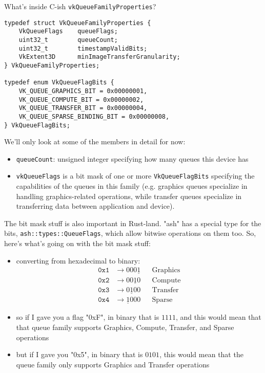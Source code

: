 \documentclass[12pt,letterpaper]{article}
\newcommand{\ril}[1]{\texttt{#1}}
\newcommand{\cil}[1]{\texttt{#1}}
\begin{document}
		What's inside C-ish \cil{vkQueueFamilyProperties}?
	\begin{verbatim}
typedef struct VkQueueFamilyProperties {
	VkQueueFlags    queueFlags;
	uint32_t        queueCount;
	uint32_t        timestampValidBits;
	VkExtent3D      minImageTransferGranularity;
} VkQueueFamilyProperties;

typedef enum VkQueueFlagBits {
	VK_QUEUE_GRAPHICS_BIT = 0x00000001,
	VK_QUEUE_COMPUTE_BIT = 0x00000002,
	VK_QUEUE_TRANSFER_BIT = 0x00000004,
	VK_QUEUE_SPARSE_BINDING_BIT = 0x00000008,
} VkQueueFlagBits;
	\end{verbatim}
	
		We'll only look at some of the members in detail for now:
			\begin{itemize}
				\item \cil{queueCount}: unsigned integer specifying how many queues this device has 
				\item \cil{vkQueueFlags} is a bit mask of one or more \cil{VkQueueFlagBits} specifying the capabilities of the queues in this family (e.g. graphics queues specialize in handling graphics-related operations, while transfer queues specialize in transferring data between application and device).
			\end{itemize}
		
		The bit mask stuff is also important in Rust-land. "ash" has a special type for the bits, \ril{ash::types::QueueFlags}, which allow bitwise operations on them too. So, here's what's going on with the bit mask stuff:
			\begin{itemize}
				\item converting from hexadecimal to binary:
					\begin{align*}
						\mathtt{0x1} &\rightarrow 000\underline{1} && \text{Graphics}\\
						\mathtt{0x2} &\rightarrow 00\underline{1}0 && \text{Compute}\\
						\mathtt{0x3} &\rightarrow 0\underline{1}00 && \text{Transfer}\\
						\mathtt{0x4} &\rightarrow \underline{1}000 && \text{Sparse}
					\end{align*}
				
				\item so if I gave you a flag "0xF", in binary that is $1111$, and this would mean that that queue family supports Graphics, Compute, Transfer, and Sparse operations
				
				\item but if I gave you "0x5", in binary that is $0101$, this would mean that the queue family only supports Graphics and Transfer operations
			\end{itemize}
		
\end{document}
